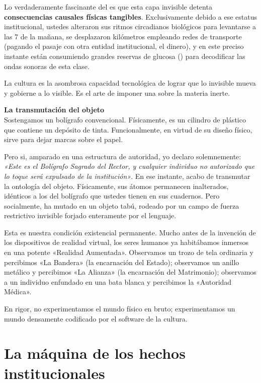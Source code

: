 Lo verdaderamente fascinante del \AnimalSimbolico{} es que esta capa invisible detenta \textbf{consecuencias causales físicas tangibles}. Exclusivamente debido a ese estatus institucional, ustedes alteraron sus ritmos circadianos biológicos para levantarse a las 7 de la mañana, se desplazaron kilómetros empleando redes de transporte (pagando el pasaje con otra entidad institucional, el dinero), y en este preciso instante están consumiendo grandes reservas de glucosa (\HechoBruto) para decodificar las ondas sonoras de esta clase. 

La cultura es la asombrosa capacidad tecnológica de lograr que lo invisible mueva y gobierne a lo visible. Es el arte de imponer una \FuncionEstatus{} sobre la materia inerte. 

\begin{ejemplo}
\textbf{La transmutación del objeto}\\
Sostengamos un bolígrafo convencional. Físicamente, es un cilindro de plástico que contiene un depósito de tinta. Funcionalmente, en virtud de su diseño físico, sirve para dejar marcas sobre el papel. 

Pero si, amparado en una estructura de autoridad, yo declaro solemnemente: \textit{«Este es el Bolígrafo Sagrado del Rector, y cualquier individuo no autorizado que lo toque será expulsado de la institución»}. En ese instante, acabo de transmutar la ontología del objeto. Físicamente, sus átomos permanecen inalterados, idénticos a los del bolígrafo que ustedes tienen en sus cuadernos. Pero socialmente, ha mutado en un objeto tabú, rodeado por un campo de fuerza restrictivo invisible forjado enteramente por el lenguaje.
\end{ejemplo}

Esta es nuestra condición existencial permanente. Mucho antes de la invención de los dispositivos de realidad virtual, los seres humanos ya habitábamos inmersos en una potente «Realidad Aumentada». Observamos un trozo de tela ordinaria y percibimos «La Bandera» (la encarnación del Estado); observamos un anillo metálico y percibimos «La Alianza» (la encarnación del Matrimonio); observamos a un individuo enfundado en una bata blanca y percibimos la «Autoridad Médica». 

En rigor, no experimentamos el mundo físico en bruto; experimentamos un mundo densamente codificado por el software de la cultura.

\section{La máquina de los hechos institucionales}

